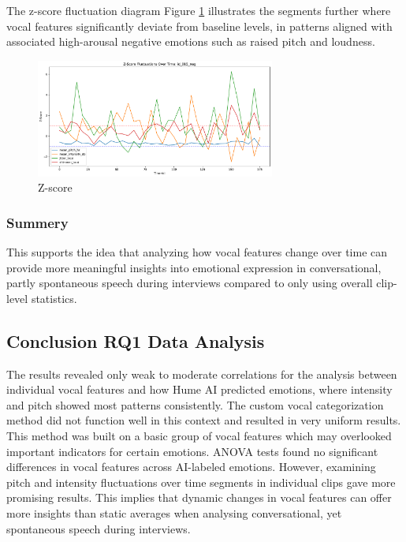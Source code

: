 The z-score fluctuation diagram Figure \ref{fig:z-score-15} illustrates the segments further where vocal features significantly deviate from baseline levels, in patterns aligned with associated high-arousal negative emotions such as raised pitch and loudness. 

\begin{figure}[H]
    \centering 
    \includegraphics[width=0.7\textwidth]{png/results/rq1/zscore_fluctuations_id_015_neg.pdf}
    \caption{Z-score}
    \label{fig:z-score-15}
\end{figure}

\subsubsection{Summery}
This supports the idea that analyzing how vocal features change over time  can provide more meaningful insights into emotional expression in conversational, partly spontaneous speech during interviews compared to only using overall clip-level statistics.

\subsection{Conclusion RQ1 Data Analysis}
The results revealed only weak to moderate correlations for the analysis between individual vocal features and how Hume AI predicted emotions, where intensity and pitch showed most patterns consistently. 
The custom vocal categorization method did not function well in this context and resulted in very uniform results. This method was built on a basic group of vocal features which may overlooked important indicators for certain emotions. 
ANOVA tests found no significant differences in vocal features across AI-labeled emotions. However, examining pitch and intensity fluctuations over time segments in individual clips gave more promising results. This implies that dynamic changes in vocal features 
can offer more insights than static averages when analysing conversational, yet spontaneous speech during interviews. 

